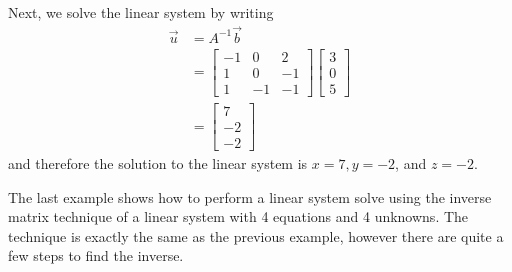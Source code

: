 \begin{example}
Next, we solve the linear system by writing
%
\begin{align*}
	\vec{u} & = A^{-1}\vec{b} \\
	& = \begin{bmatrix}
-1 & 0 & 2\\
1 & 0 & -1 \\
1 & -1 & -1
\end{bmatrix}
\begin{bmatrix}
	3\\ 0 \\ 5
\end{bmatrix} \\
& =
\begin{bmatrix}
	7 \\ -2 \\ -2
\end{bmatrix}
\end{align*}
and therefore the solution to the linear system is $x=7, y=-2$, and $z=-2$.
\end{example}

The last example shows how to perform a linear system solve using the inverse matrix technique of a linear system with 4 equations and 4 unknowns.  The technique is exactly the same as the previous example, however there are quite a few steps to find the inverse.


